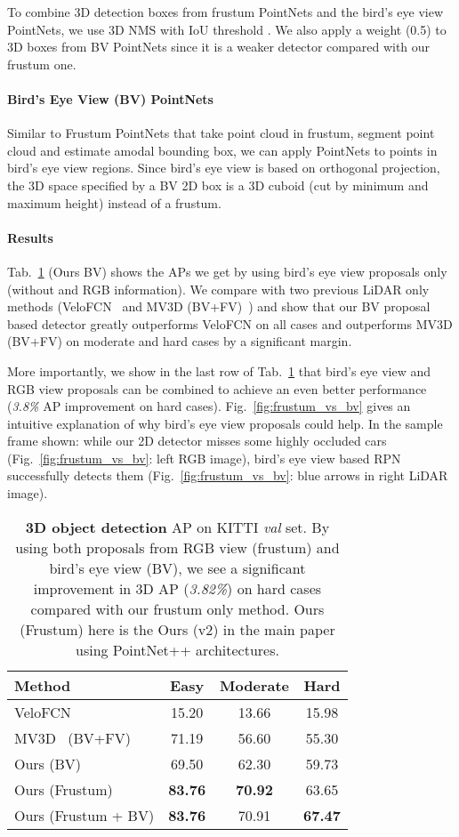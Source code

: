 \documentclass[10pt,twocolumn,letterpaper]{article}
\begin{document}
To combine 3D detection boxes from frustum PointNets and the bird's eye view PointNets, we use 3D NMS with IoU threshold . We also apply a weight (0.5) to 3D boxes from BV PointNets since it is a weaker detector compared with our frustum one.

\paragraph{Bird's Eye View (BV) PointNets} Similar to Frustum PointNets that take point cloud in frustum, segment point cloud and estimate amodal bounding box, we can apply PointNets to points in bird's eye view regions. Since bird's eye view is based on orthogonal projection, the 3D space specified by a BV 2D box is a 3D cuboid (cut by minimum and maximum height) instead of a frustum.

\paragraph{Results} Tab.~\ref{tab:td_re} (Ours BV) shows the APs we get by using bird's eye view proposals only (without and RGB information). We compare with two previous LiDAR only methods (VeloFCN~\cite{li2016vehicle} and MV3D (BV+FV)~\cite{cvpr17chen}) and show that our BV proposal based detector greatly outperforms VeloFCN on all cases and outperforms MV3D (BV+FV) on moderate and hard cases by a significant margin.

More importantly, we show in the last row of Tab.~\ref{tab:td_re} that bird's eye view and RGB view proposals can be combined to achieve an even better performance (\emph{3.8\%} AP improvement on hard cases).
Fig.~\ref{fig:frustum_vs_bv} gives an intuitive explanation of why bird's eye view proposals could help. In the sample frame shown: while our 2D detector misses some highly occluded cars (Fig.~\ref{fig:frustum_vs_bv}: left RGB image), bird's eye view based RPN successfully detects them (Fig.~\ref{fig:frustum_vs_bv}: blue arrows in right LiDAR image).


\begin{table}[h!]
    \centering
    \begin{tabular}{l|ccc}
    \hline
        Method & Easy & Moderate & Hard \\ \hline
        VeloFCN~\cite{li2016vehicle} & 15.20 & 13.66 & 15.98 \\
        MV3D~\cite{cvpr17chen} (BV+FV) & 71.19 & 56.60 & 55.30 \\ \hline
        Ours (BV) &  69.50 & 62.30 & 59.73 \\
        Ours (Frustum) & \textbf{83.76} & \textbf{70.92} & 63.65 \\
        Ours (Frustum + BV) & \textbf{83.76} & 70.91 & \textbf{67.47} \\ \hline
    \end{tabular}
    \caption{\textbf{3D object detection} AP on KITTI \emph{val} set. By using both proposals from RGB view (frustum) and bird's eye view (BV), we see a significant improvement in 3D AP (\emph{3.82\%}) on hard cases compared with our frustum only method. Ours (Frustum) here is the Ours (v2) in the main paper using PointNet++ architectures.}
    \label{tab:td_re}
\end{table}
\end{document}
